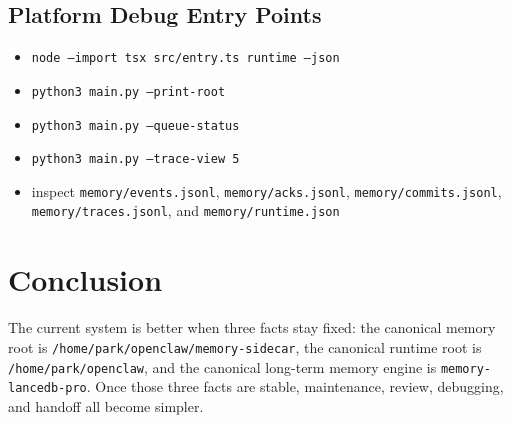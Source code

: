 \documentclass[11pt,a4paper,oneside,openany]{book}
\begin{document}
\section{Platform Debug Entry Points}
\begin{itemize}
  \item \texttt{node --import tsx src/entry.ts runtime --json}
  \item \texttt{python3 main.py --print-root}
  \item \texttt{python3 main.py --queue-status}
  \item \texttt{python3 main.py --trace-view 5}
  \item inspect \texttt{memory/events.jsonl}, \texttt{memory/acks.jsonl}, \texttt{memory/commits.jsonl}, \texttt{memory/traces.jsonl}, and \texttt{memory/runtime.json}
\end{itemize}
\backmatter
\chapter*{Conclusion}
The current system is better when three facts stay fixed: the canonical memory root is \texttt{/home/park/openclaw/memory-sidecar}, the canonical runtime root is \texttt{/home/park/openclaw}, and the canonical long-term memory engine is \texttt{memory-lancedb-pro}. Once those three facts are stable, maintenance, review, debugging, and handoff all become simpler.
\end{document}
